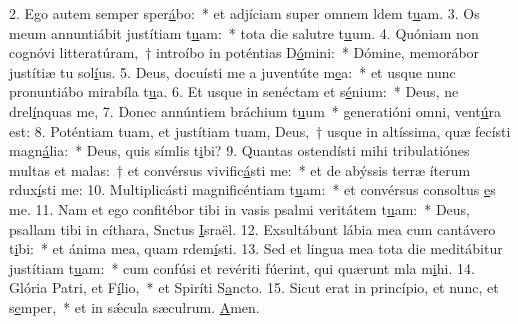 2. Ego autem semper sper\uline{á}bo:~* et adjíciam super omnem ldem t\uline{u}am.
3. Os meum annuntiábit justítiam t\uline{u}am:~* tota die salutre t\uline{u}um.
4. Quóniam non cognóvi litteratúram,~† introíbo in poténtias D\uline{ó}mini:~* Dómine, memorábor justítiæ tu sol\uline{í}us.
5. Deus, docuísti me a juventúte m\uline{e}a:~* et usque nunc pronuntiábo mirabíla t\uline{u}a.
6. Et usque in senéctam et s\uline{é}nium:~* Deus, ne drel\uline{í}nquas me,
7. Donec annúntiem bráchium t\uline{u}um~* generatióni omni,  vent\uline{ú}ra est:
8. Poténtiam tuam, et justítiam tuam, Deus,~† usque in altíssima, quæ fecísti magn\uline{á}lia:~* Deus, quis símlis t\uline{i}bi?
9. Quantas ostendísti mihi tribulatiónes multas et malas:~† et convérsus vivific\uline{á}sti me:~* et de abýssis terræ íterum rdux\uline{í}sti me:
10. Multiplicásti magnificéntiam t\uline{u}am:~* et convérsus consoltus \uline{e}s me.
11. Nam et ego confitébor tibi in vasis psalmi veritátem t\uline{u}am:~* Deus, psallam tibi in cíthara, Snctus \uline{I}sraël.
12. Exsultábunt lábia mea cum cantávero t\uline{i}bi:~* et ánima mea, quam rdem\uline{í}sti.
13. Sed et lingua mea tota die meditábitur justítiam t\uline{u}am:~* cum confúsi et revériti fúerint, qui quærunt mla m\uline{i}hi.
14. Glória Patri, et F\uline{í}lio,~* et Spiríti S\uline{a}ncto.
15. Sicut erat in princípio, et nunc, et s\uline{e}mper,~* et in sǽcula sæculrum. \uline{A}men.
